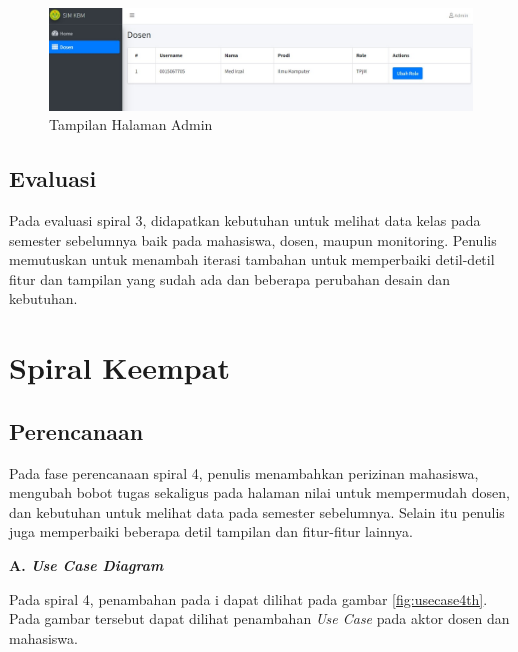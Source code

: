 \begin{figure}[h!]
	\centering
	\includegraphics[width=1\textwidth]{gambar/ss/admin}
	\caption{Tampilan Halaman Admin}
	\label{fig:ssadmin}
\end{figure}

\subsection{Evaluasi}
	Pada evaluasi spiral 3, didapatkan kebutuhan untuk melihat data kelas pada semester sebelumnya baik pada mahasiswa, dosen, maupun monitoring. Penulis memutuskan untuk menambah iterasi tambahan untuk memperbaiki detil-detil fitur dan tampilan yang sudah ada dan beberapa perubahan desain dan kebutuhan.

\section{Spiral Keempat}		%
\subsection{Perencanaan}
	Pada fase perencanaan spiral 4, penulis menambahkan perizinan mahasiswa, mengubah bobot tugas sekaligus pada halaman nilai untuk mempermudah dosen, dan kebutuhan untuk melihat data pada semester sebelumnya. Selain itu penulis juga memperbaiki beberapa detil tampilan dan fitur-fitur lainnya.

\textbf{A. \textit{Use Case Diagram}}

	Pada spiral 4, penambahan pada i dapat dilihat pada gambar \ref{fig:usecase4th}. Pada gambar tersebut dapat dilihat penambahan \textit{Use Case} pada aktor dosen dan mahasiswa. 

